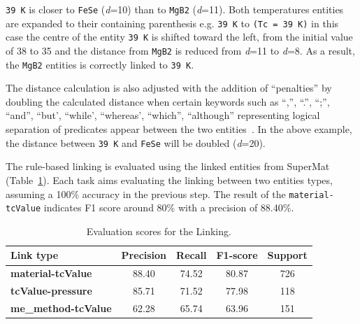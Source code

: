 \documentclass{article}
\newcommand{\tc}{T$_{c}$}
\begin{document}
\texttt{39 K} is closer to \texttt{FeSe} (\textit{d}=10) than to \texttt{MgB2} (\textit{d}=11).
Both temperatures entities are expanded to their containing parenthesis e.g. \texttt{39 K} to \texttt{(Tc = 39 K)} in this case the centre of the entity \texttt{39 K} is shifted toward the left, from the initial value of 38 to 35 and the distance from \texttt{MgB2} is reduced from \textit{d}=11 to \textit{d}=8. 
As a result, the \texttt{MgB2} entities is correctly linked to \texttt{39 K}. 

The distance calculation is also adjusted with the addition of ``penalties'' by doubling the calculated distance when certain keywords such as ``,'', ``.'', ``;'', ``and'', ``but', ``while', ``whereas', ``which'', ``although'' representing logical separation of predicates appear between the two entities~\cite{oka2021table}. 
In the above example, the distance between \texttt{39 K} and \texttt{FeSe} will be doubled (\textit{d}=20).

The rule-based linking is evaluated using the linked entities from SuperMat~\cite{foppiano2021supermat} (Table~\ref{table:evaluation-linking}). 
Each task aims evaluating the linking between two entities types, assuming a 100\% accuracy in the previous step. 
The result of the \texttt{material-tcValue} indicates F1 score around 80\% with a precision of 88.40\%.

\begin{table}[ht]
\centering\small
\begin{tabular}{lcccc}
\toprule 
\textbf{Link type} & \textbf{Precision} & \textbf{Recall} & \textbf{F1-score} & Support \\ 
\midrule
\textbf{material-tcValue}      &  88.40    & 74.52 &    80.87 &   726  \\
\textbf{tcValue-pressure}      & 85.71  &  71.52  &  77.98  &  118     \\
\textbf{me\_method-tcValue}    & 62.28 & 65.74 &  63.96  &  151 \\
\bottomrule
\end{tabular}
\caption{\label{table:evaluation-linking} Evaluation scores for the Linking. }
\end{table}
\end{document}
